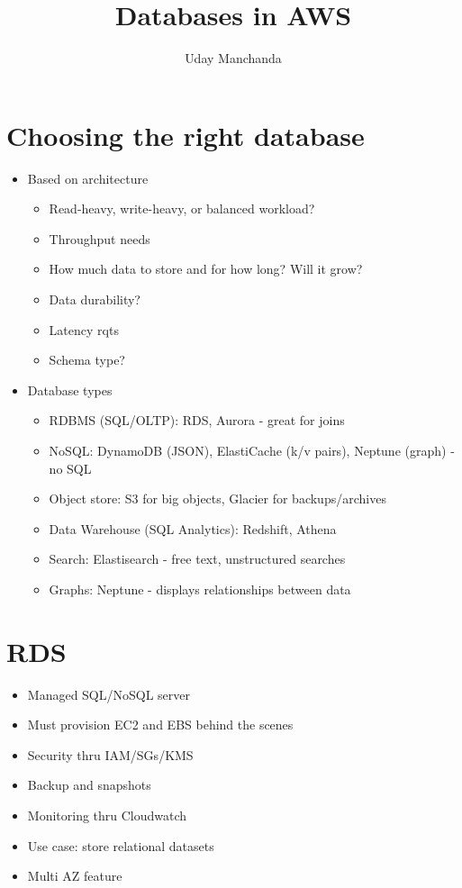 \documentclass[]{scrartcl}
\title{Databases in AWS}
\author{Uday Manchanda}
\begin{document}
\maketitle

\section{Choosing the right database}
\begin{itemize}
	\item Based on architecture
	\begin{itemize}
		\item Read-heavy, write-heavy, or balanced workload?
		\item Throughput needs
		\item How much data to store and for how long? Will it grow?
		\item Data durability?
		\item Latency rqts
		\item Schema type?
	\end{itemize}
	\item Database types
	\begin{itemize}
		\item RDBMS (SQL/OLTP): RDS, Aurora - great for joins
		\item NoSQL: DynamoDB (JSON), ElastiCache (k/v pairs), Neptune (graph) - no SQL
		\item Object store: S3 for big objects, Glacier for backups/archives
		\item Data Warehouse (SQL Analytics): Redshift, Athena
		\item Search: Elastisearch  - free text, unstructured searches
		\item Graphs: Neptune - displays relationships between data
	\end{itemize}
\end{itemize}

\section{RDS}
\begin{itemize}
	\item Managed SQL/NoSQL server
	\item Must provision EC2 and EBS behind the scenes
	\item Security thru IAM/SGs/KMS
	\item Backup and snapshots
	\item Monitoring thru Cloudwatch
	\item Use case: store relational datasets
	\item Multi AZ feature
\end{itemize}
\end{document}
